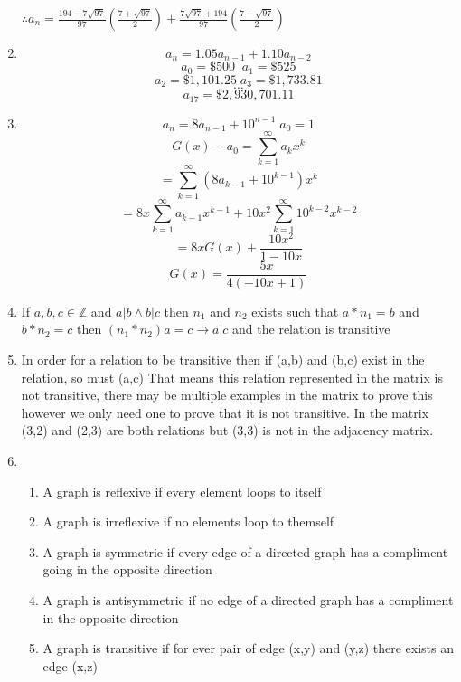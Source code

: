 \documentclass[11pt]{article}
\begin{document}
\begin{enumerate}
        $\therefore a_n = \frac{194-7\sqrt{97}}{97}(\frac{7 + \sqrt{97}}{2}) + \frac{7\sqrt{97} + 194}{97}(\frac{7 - \sqrt{97}}{2})$
    \item $$a_n = 1.05a_{n-1} + 1.10a_{n-2}$$
          $$a_0 = \$500 \; \; a_1 = \$525 $$
          $$a_2 = \$1,101.25 \; a_3 = \$1,733.81$$
          $$ \dots $$
          $$ a_{17} = \$2,930,701.11 $$
    \item $$ a_n = 8a_{n-1} + 10^{n-1} \; a_0 = 1$$
          $$ G(x) - a_0 = \sum_{k = 1}^{\infty}a_kx^k$$
          $$ = \sum_{k = 1}^{\infty}(8a_{k-1}+10^{k-1})x^k$$
          $$ = 8x\sum_{k = 1}^{\infty}a_{k-1}x^{k-1} + 10x^2\sum_{k = 1}^{\infty}10^{k-2}x^{k-2}$$
          $$ = 8xG(x) + \frac{10x^2}{1-10x} $$
          $$ G(x) = \frac{5x}{4(-10x + 1)} $$
    \item If $a, b, c \in \mathbb{Z}$ and $a | b \wedge b | c$ then $n_1$ and $n_2$ exists such that $a*n_1 = b$
        and $b*n_2 = c$ then $ (n_1 * n_2)a = c \rightarrow a | c$ and the relation is transitive
    \item In order for a relation to be transitive then if (a,b) and (b,c) exist in the relation, so must (a,c)
        That means this relation represented in the matrix is not transitive, there may be multiple examples in the
        matrix to prove this however we only need one to prove that it is not transitive. In the matrix (3,2) and (2,3)
        are both relations but (3,3) is not in the adjacency matrix.
    \item \begin{enumerate}
        \item A graph is reflexive if every element loops to itself
        \item A graph is irreflexive if no elements loop to themself
        \item A graph is symmetric if every edge of a directed graph has a compliment going in the opposite direction
        \item A graph is antisymmetric if no edge of a directed graph has a compliment in the opposite direction
        \item A graph is transitive if for ever pair of edge (x,y) and (y,z) there exists an edge (x,z)
    \end{enumerate}
\end{enumerate}
\end{document}
